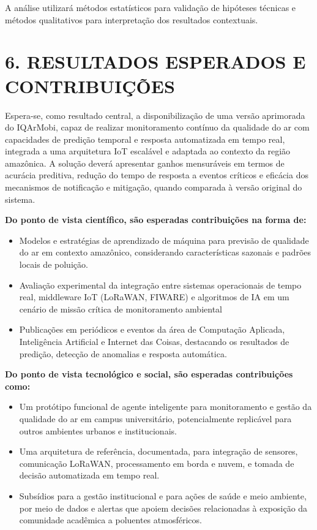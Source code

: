 \documentclass[12pt, a4paper]{article}
\begin{document}
A análise utilizará métodos estatísticos para validação de hipóteses técnicas e 
métodos qualitativos para interpretação dos resultados contextuais.

\section*{6. RESULTADOS ESPERADOS E CONTRIBUIÇÕES}

Espera-se, como resultado central, a disponibilização de uma versão
aprimorada do IQArMobi, capaz de realizar monitoramento contínuo da
qualidade do ar com capacidades de predição temporal e resposta
automatizada em tempo real, integrada a uma arquitetura IoT escalável e
adaptada ao contexto da região amazônica. A solução deverá apresentar
ganhos mensuráveis em termos de acurácia preditiva, redução do tempo
de resposta a eventos críticos e eficácia dos mecanismos de
notificação e mitigação, quando comparada à versão original do sistema.

\textbf{Do ponto de vista científico, são esperadas contribuições na forma de:}
\begin{itemize}
    \item Modelos e estratégias de aprendizado de máquina para previsão
    de qualidade do ar em contexto amazônico, considerando
    características sazonais e padrões locais de poluição.
    \item Avaliação experimental da integração entre sistemas
    operacionais de tempo real, middleware IoT (LoRaWAN, FIWARE) e
    algoritmos de IA em um cenário de missão crítica de monitoramento
    ambiental
    \item Publicações em periódicos e eventos da área de Computação
    Aplicada, Inteligência Artificial e Internet das Coisas, destacando
    os resultados de predição, detecção de anomalias e resposta
    automática.
\end{itemize}

\textbf{Do ponto de vista tecnológico e social, são esperadas contribuições como:}
\begin{itemize}
    \item Um protótipo funcional de agente inteligente para monitoramento
    e gestão da qualidade do ar em campus universitário, potencialmente
    replicável para outros ambientes urbanos e institucionais.
    \item Uma arquitetura de referência, documentada, para integração de
    sensores, comunicação LoRaWAN, processamento em borda e nuvem, e
    tomada de decisão automatizada em tempo real.
    \item Subsídios para a gestão institucional e para ações de saúde e
    meio ambiente, por meio de dados e alertas que apoiem decisões
    relacionadas à exposição da comunidade acadêmica a poluentes
    atmosféricos.
\end{itemize}
\end{document}
